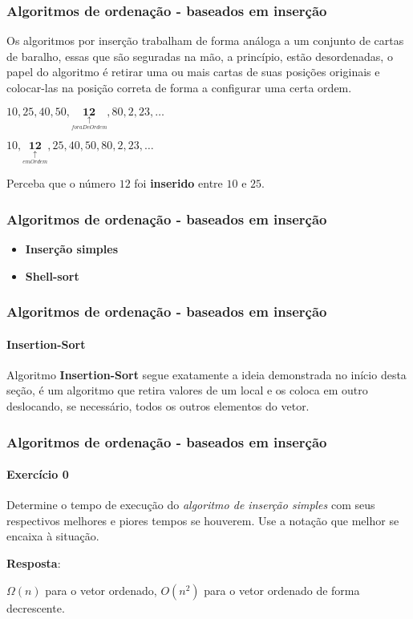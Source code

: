 \begin{frame}
	\frametitle{Algoritmos de ordenação - baseados em inserção}
	\par Os algoritmos por inserção trabalham de forma análoga a um conjunto de cartas de baralho, essas que são seguradas na mão, a princípio, estão desordenadas, o papel do algoritmo é retirar uma ou mais cartas de suas posições originais e colocar-las na posição correta de forma a configurar uma certa ordem.\newline
	\par $10, 25, 40, 50, \underset{\underset{foraDeOrdem}{\uparrow}}{\mathbf{12}}, 80, 2, 23, \dots $ \newline
	\par $10, \underset{\underset{emOrdem}{\uparrow}}{\mathbf{12}}, 25, 40, 50, 80, 2, 23, \dots $ \newline
	
	\par Perceba que o número $12$ foi \textbf{inserido} entre $10$ e $25$. 
\end{frame}

\begin{frame}
	\frametitle{Algoritmos de ordenação - baseados em inserção}
	\begin{itemize}
		\item \textbf{Inserção simples}
		\item \textbf{Shell-sort}
	\end{itemize}
\end{frame}

\begin{frame}
	\frametitle{Algoritmos de ordenação - baseados em inserção}
	\framesubtitle{Insertion-Sort}
	\par Algoritmo \textbf{Insertion-Sort} segue exatamente a ideia demonstrada no início desta seção, é um algoritmo que retira valores de um local e os coloca em outro deslocando, se necessário, todos os outros elementos do vetor. 
	
\end{frame}

\begin{frame}
	\frametitle{Algoritmos de ordenação - baseados em inserção}
	\framesubtitle{Exercício 0}
	\par Determine o tempo de execução do \textit{algoritmo de inserção simples} com seus respectivos melhores e piores tempos se houverem. Use a notação que melhor se encaixa à situação.
	\pause
	\par \textbf{Resposta}:
	\par $\Omega(n)$ para o vetor ordenado, $O(n^2)$ para o vetor ordenado de forma decrescente.
\end{frame}

